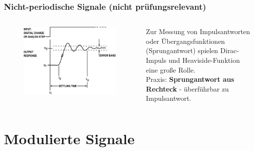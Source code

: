 \begin{frame}
  \frametitle{Nicht-periodische Signale (nicht prüfungsrelevant)}
  \begin{columns}
    \begin{center}
      \begin{figure}
        \includegraphics[width=\textwidth,height=0.7\textheight,keepaspectratio]{a11/High_accuracy_settling_time_measurements_figure_1.png}
      \end{figure}
    \end{center}
    Zur Messung von Impulsantworten oder Übergangsfunktionen (Sprungantwort)
    spielen Dirac-Impuls und Heaviside-Funktion eine große Rolle. \\[2em]
    Praxis: \textbf{Sprungantwort aus Rechteck} - überführbar zu Impulsantwort.
  \end{columns}
\end{frame}

\section{Modulierte Signale}

